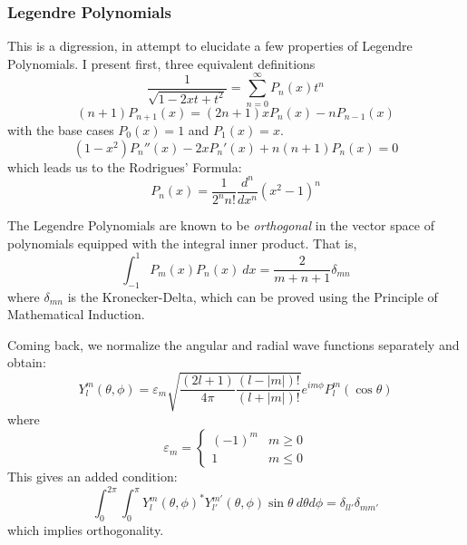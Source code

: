 \subsubsection*{Legendre Polynomials}
This is a digression, in attempt to elucidate a few properties of Legendre Polynomials. I present first, three equivalent definitions
\begin{equation*}
    \frac{1}{\sqrt{1-2xt+t^2}} = \sum_{n=0}^\infty P_n(x)t^n
\end{equation*}
\begin{equation*}
    (n + 1)P_{n+1}(x) = (2n + 1)xP_n(x) - nP_{n-1}(x)
\end{equation*}
with the base cases $P_0(x) = 1$ and $P_1(x) = x$.
\begin{equation*}
    (1-x^2)P_n''(x) - 2xP_n'(x) + n(n+1)P_n(x) = 0
\end{equation*}
which leads us to the Rodrigues' Formula:
\begin{equation*}
    P_n(x) = \frac{1}{2^nn!}\frac{d^n}{dx^n}(x^2 - 1)^n
\end{equation*}

The Legendre Polynomials are known to be \textit{orthogonal} in the vector space of polynomials equipped with the integral inner product. That is,
\begin{equation*}
    \int_{-1}^1P_m(x)P_n(x)~dx = \frac{2}{m + n + 1}\delta_{mn}
\end{equation*}
where $\delta_{mn}$ is the Kronecker-Delta, which can be proved using the Principle of Mathematical Induction.

\hrulefill

Coming back, we normalize the angular and radial wave functions separately and obtain:
\begin{equation*}
    Y_l^m(\theta,\phi) = \varepsilon_m\sqrt{\frac{(2l + 1)}{4\pi}\frac{(l - |m|)!}{(l + |m|)!}}e^{im\phi}P_l^m(\cos\theta)
\end{equation*}
where 
\begin{equation*}
    \varepsilon_m = 
    \begin{cases}
        (-1)^m & m\ge0\\
        1 & m\le0
    \end{cases}
\end{equation*}
This gives an added condition:
\begin{equation*}
    \int_0^{2\pi}\int_0^\pi Y_l^m(\theta,\phi)^*Y_{l'}^{m'}(\theta,\phi)\sin\theta~d\theta d\phi = \delta_{ll'}\delta_{mm'}
\end{equation*}
which implies orthogonality. 

